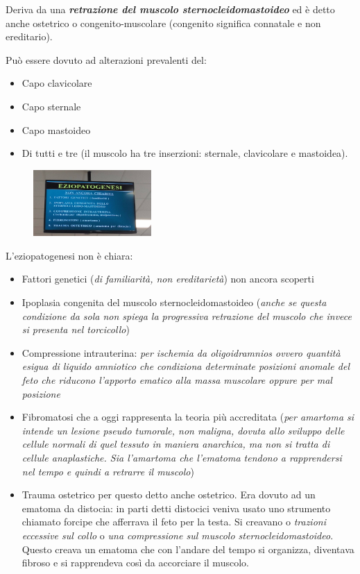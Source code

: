 Deriva da una \textbf{\emph{retrazione del muscolo sternocleidomastoideo}} ed è detto anche ostetrico o congenito-muscolare (congenito significa connatale e non ereditario).

Può essere dovuto ad alterazioni prevalenti del:

\begin{itemize}
\item
  Capo clavicolare
\item
  Capo sternale
\item
  Capo mastoideo
\item
  Di tutti e tre (il muscolo ha tre inserzioni: sternale, clavicolare e mastoidea).
\end{itemize}

\begin{figure}[!ht]
\centering
\includegraphics[width=0.4\textwidth]{013/image21.jpeg}
\end{figure}

L'eziopatogenesi non è chiara:

\begin{itemize}
\item
  Fattori genetici (\emph{di familiarità, non ereditarietà}) non ancora scoperti
\item
  Ipoplasia congenita del muscolo sternocleidomastoideo (\emph{anche se questa condizione da sola non spiega la progressiva retrazione del muscolo che invece si presenta nel torcicollo})
\item
  Compressione intrauterina: \emph{per \emph{ischemia da oligoidramnios} ovvero quantità esigua di liquido amniotico che condiziona determinate posizioni anomale del feto che riducono l'apporto ematico alla massa muscolare oppure \emph{per mal posizione}}
\item
  Fibromatosi che a oggi rappresenta la teoria più accreditata (\emph{per amartoma si intende un lesione pseudo tumorale, non maligna, dovuta allo sviluppo delle cellule normali di quel tessuto in maniera anarchica, ma non si tratta di cellule anaplastiche. Sia l'amartoma che l'ematoma tendono a rapprendersi nel tempo e quindi a retrarre il muscolo})
\item
  Trauma ostetrico per questo detto anche ostetrico. Era dovuto ad un ematoma da distocia: in parti detti distocici veniva usato uno strumento chiamato forcipe che afferrava il feto per la testa. Si creavano o \emph{trazioni eccessive sul collo} o \emph{una compressione sul muscolo sternocleidomastoideo}. Questo creava un ematoma che con l'andare del tempo si organizza, diventava fibroso e si rapprendeva così da accorciare il muscolo.
\end{itemize}

